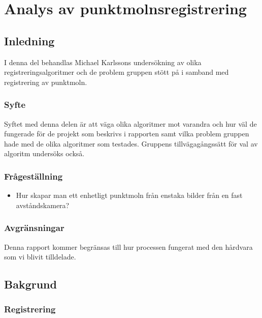 \chapter{Analys av punktmolnsregistrering}
\label{cha:indiv-report-karlsson}


\section{Inledning}
\label{sec:introduction-karlsson}

I denna del behandlas Michael Karlssons undersökning av olika registreringsalgoritmer och de problem gruppen stött på i samband med registrering av punktmoln.

\subsection{Syfte}
\label{sec:purpose-karlsson}

Syftet med denna delen är att väga olika algoritmer mot varandra och hur väl de fungerade för de projekt som beskrivs i rapporten samt vilka problem gruppen hade med de olika algoritmer som testades. Gruppens tillvägagångssätt för val av algoritm undersöks också.


\subsection{Frågeställning}
\label{sec:issue-karlsson}

\begin{itemize}
	\item Hur skapar man ett enhetligt punktmoln från enstaka bilder från en fast \newline avståndskamera?
\end{itemize}
\subsection{Avgränsningar}

Denna rapport kommer begränsas till hur processen fungerat med den hårdvara som vi blivit tilldelade.


\section{Bakgrund}
\label{sec:background-karlsson}

\subsection{Registrering}

